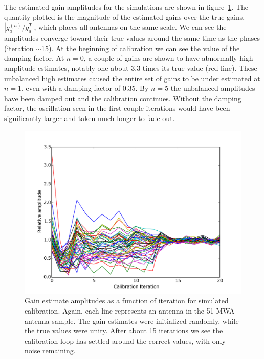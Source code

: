 \documentclass[a4paper,fleqn,usenatbib]{../mnras}
\begin{document}
The estimated gain amplitudes for the simulations are shown in figure~\ref{fig:sim_amp}. The quantity plotted is the magnitude of the estimated gains over the true gains, $\left|g^{(n)}_a/g^T_a\right|$, which places all antennas on the same scale. We can see the amplitudes converge toward their true values around the same time as the phases (iteration $\sim$15). At the beginning of calibration we can see the value of the damping factor. At $n=0$, a couple of gains are shown to have abnormally high amplitude estimates, notably one about 3.3 times its true value (red line). These unbalanced high estimates caused the entire set of gains to be under estimated at $n=1$, even with a damping factor of 0.35. By $n=5$ the unbalanced amplitudes have been damped out and the calibration continues. Without the damping factor, the oscillation seen in the first couple iterations would have been significantly larger and taken much longer to fade out.

\begin{figure}
\begin{center}
\includegraphics[width=\columnwidth]{figures/cal_paper_sim_amps.pdf}
\caption{Gain estimate amplitudes as a function of iteration for simulated calibration. Again, each line represents an antenna in the 51 MWA antenna sample. The gain estimates were initialized randomly, while the true values were unity. After about 15 iterations we see the calibration loop has settled around the correct values, with only noise remaining.}
\label{fig:sim_amp}
\end{center}
\end{figure}
\end{document}
